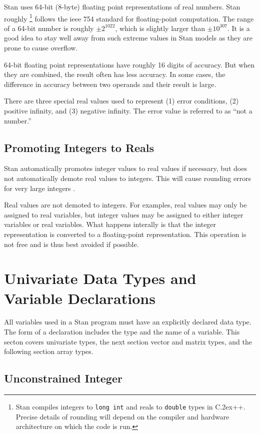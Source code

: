 \documentclass[10pt]{report}
\newcommand{\Stan}{Stan\xspace}
\newcommand*{\Cpp}{C\raise.2ex\hbox{\footnotesize ++}\xspace} %
\newcommand{\code}[1]{{\tt #1}}
\begin{document}
\Stan uses 64-bit (8-byte) floating point representations of real
numbers.  \Stan roughly%
%
\footnote{\Stan compiles integers to \code{long int} and reals to
  \code{double} types in \Cpp.  Precise details of rounding will depend
  on the compiler and hardware architecture on which the code is run.}
%
follows the {\sc ieee} 754 standard for floating-point computation.
The range of a 64-bit number is roughly $\pm 2^{1022}$, which is
slightly larger than $\pm 10^{307}$.  It is a good idea to stay well
away from such extreme values in \Stan models as they are prone to
cause overflow.

64-bit floating point representations have roughly 16 digits of
accuracy.  But when they are combined, the result often has less
accuracy.  In some cases, the difference in accuracy between two
operands and their result is large.  

There are three special real values used to represent (1) error
conditions, (2) positive infinity, and (3) negative infinity.  The
error value is referred to as ``not a number.''

\subsection{Promoting Integers to Reals}

\Stan automatically promotes integer values to real values if
necessary, but does not automatically demote real values to integers.
This will cause rounding errors for very large integers .

Real values are not demoted to integers.  For examples, real values
may only be assigned to real variables, but integer values may be
assigned to either integer variables or real variables.  What happens
interally is that the integer representation is converted to a
floating-point representation.  This operation is not free and is thus
best avoided if possible.


\section{Univariate Data Types and Variable Declarations}

All variables used in a \Stan program must have an explicitly declared
data type.  The form of a declaration includes the type and the name
of a variable.  This secton covers univariate types, the next section
vector and matrix types, and the following section array types.

\subsection{Unconstrained Integer}
\end{document}
